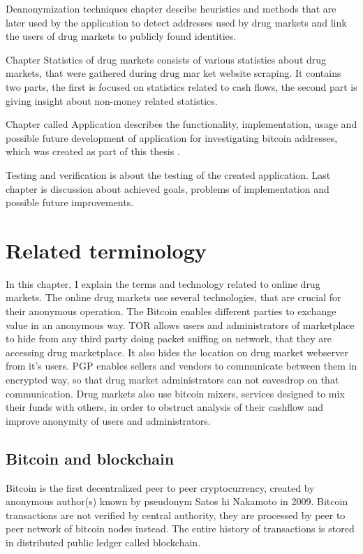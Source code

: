 \documentclass[
  digital, %
  table,   %
  lof,     %
  lot,     %
  oneside
]{fithesis3}
\begin{document}
Deanonymization techniques chapter descibe heuristics and methods that are later used by the application to detect 
addresses used by drug markets and link the users of drug markets to publicly found identities.

Chapter Statistics of drug markets consists of various statistics about drug markets, that were gathered during drug mar
ket website scraping.
It contains two parts, the first is focused on statistics related to cash flows, the second part is giving insight about
 non-money related statistics.

Chapter called Application describes the functionality, implementation, usage and 
possible future development of application for investigating bitcoin addresses, which was created as part of this thesis
.

Testing and verification is about the testing of the created application.
Last chapter is discussion about achieved goals, problems of implementation and possible future improvements.

\chapter{Related terminology}

In this chapter, I explain the terms and technology related to online drug markets.
The online drug markets use several technologies, that are crucial for their anonymous operation.
The Bitcoin enables different parties to exchange value in an anonymous way.
TOR allows users and administrators of marketplace to hide from any third party doing packet sniffing on network,
that they are accessing drug marketplace. It also hides the location on drug market webserver from it's users.
PGP enables sellers and vendors to communicate between them in encrypted way,
so that drug market administrators can not eavesdrop on that communication.
Drug markets also use bitcoin mixers, services designed to mix their funds with others, in order to obstruct
analysis of their cashflow and improve anonymity of users and administrators.

\section{Bitcoin and blockchain}

Bitcoin is  the first decentralized peer to peer cryptocurrency, created by anonymous author(s) known by pseudonym Satos
hi Nakamoto in 2009.
Bitcoin transactions are not verified by central authority, they are  
processed by peer to peer network of bitcoin nodes instead. 
The entire history of transactions is stored in distributed public ledger called blockchain.
\end{document}
